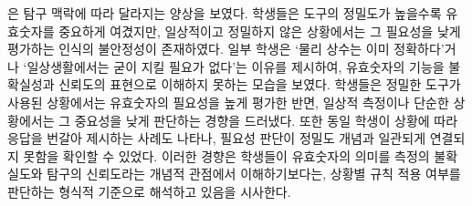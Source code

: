 은 탐구 맥락에 따라 달라지는 양상을 보였다.
%
학생들은 도구의 정밀도가 높을수록 유효숫자를 중요하게 여겼지만,
일상적이고 정밀하지 않은 상황에서는 그 필요성을 낮게 평가하는 인식의 불안정성이 존재하였다.
일부 학생은 `물리 상수는 이미 정확하다'거나
`일상생활에서는 굳이 지킬 필요가 없다'는 이유를 제시하여,
유효숫자의 기능을 불확실성과 신뢰도의 표현으로 이해하지 못하는 모습을 보였다.
%
학생들은 정밀한 도구가 사용된 상황에서는 유효숫자의 필요성을 높게 평가한 반면,
일상적 측정이나 단순한 상황에서는 그 중요성을 낮게 판단하는 경향을 드러냈다.
%
또한 동일 학생이 상황에 따라 응답을 번갈아 제시하는 사례도 나타나,
필요성 판단이 정밀도 개념과 일관되게 연결되지 못함을 확인할 수 있었다.
%
이러한 경향은 학생들이 유효숫자의 의미를 측정의 불확실도와 탐구의 신뢰도라는
개념적 관점에서 이해하기보다는, 상황별 규칙 적용 여부를 판단하는
형식적 기준으로 해석하고 있음을 시사한다.